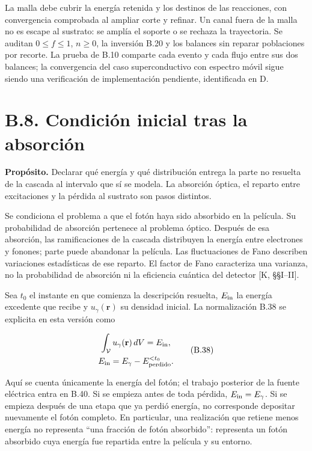 \documentclass[
  spanish,
  10pt,
  a4paper,
]{article}
\newcounter{none} %
\begin{document}
La malla debe cubrir la energía retenida y los destinos de las
reacciones, con convergencia comprobada al ampliar corte y refinar. Un
canal fuera de la malla no es escape al sustrato: se amplía el soporte o
se rechaza la trayectoria. Se auditan \(0\leq f\leq1\), \(n\geq0\), la
inversión B.20 y los balances sin reparar poblaciones por recorte. La
prueba de B.10 comparte cada evento y cada flujo entre sus dos balances;
la convergencia del caso superconductivo con espectro móvil sigue siendo
una verificación de implementación pendiente, identificada en D.

\section{B.8. Condición inicial tras la
absorción}\label{b.8.-condiciuxf3n-inicial-tras-la-absorciuxf3n}

\textbf{Propósito.} Declarar qué energía y qué distribución entrega la
parte no resuelta de la cascada al intervalo que sí se modela. La
absorción óptica, el reparto entre excitaciones y la pérdida al sustrato
son pasos distintos.

Se condiciona el problema a que el fotón haya sido absorbido en la
película. Su probabilidad de absorción pertenece al problema óptico.
Después de esa absorción, las ramificaciones de la cascada distribuyen
la energía entre electrones y fonones; parte puede abandonar la
película. Las fluctuaciones de Fano describen variaciones estadísticas
de ese reparto. El factor de Fano caracteriza una varianza, no la
probabilidad de absorción ni la eficiencia cuántica del detector {[}K,
§§I--II{]}.

Sea \(t_0\) el instante en que comienza la descripción resuelta,
\(E_{\rm in}\) la energía excedente que recibe y \(u_\gamma(\mathbf r)\)
su densidad inicial. La normalización B.38 se explicita en esta versión
como

\[
\begin{gathered}
\int_{\mathcal V}u_\gamma(\mathbf r)\,dV=E_{\rm in},\\
E_{\rm in}=E_\gamma-E_{\rm perdido}^{<t_0}.
\end{gathered} \tag{B.38}
\]

Aquí se cuenta únicamente la energía del fotón; el trabajo posterior de
la fuente eléctrica entra en B.40. Si se empieza antes de toda pérdida,
\(E_{\rm in}=E_\gamma\). Si se empieza después de una etapa que ya
perdió energía, no corresponde depositar nuevamente el fotón completo.
En particular, una realización que retiene menos energía no representa
``una fracción de fotón absorbido'': representa un fotón absorbido cuya
energía fue repartida entre la película y su entorno.
\end{document}
